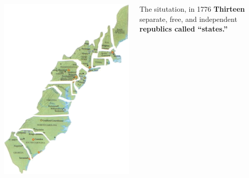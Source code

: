 \begin{frame}
    \begin{columns}[onlytextwidth]
            \centering
            \includegraphics[height=0.75\textheight]{img/colonies.png} \\

            \begin{block}{The situtation, in 1776}
            \textbf{Thirteen} separate, free, and independent \textbf{republics called ``states.''}
            \end{block}
    \end{columns}
\end{frame}

